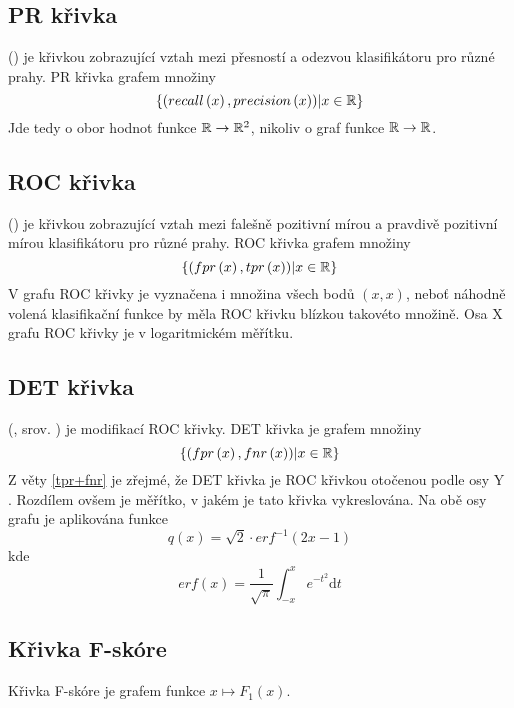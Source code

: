 \subsection{PR křivka}
 () je křivkou zobrazující vztah mezi přesností a odezvou klasifikátoru pro různé prahy. PR křivka grafem množiny
\[ \left\{ \left( recall \left( x \right), precision \left( x \right) \right) \middle| x \in \mathbb R \right\} \]
Jde tedy o obor hodnot funkce \( \mathbb R \to \mathbb R^2 \), nikoliv o graf funkce \( \mathbb R \to \mathbb R \).

\subsection{ROC křivka}
 () je křivkou zobrazující vztah mezi falešně pozitivní mírou a pravdivě pozitivní mírou klasifikátoru pro různé prahy. ROC křivka grafem množiny
\[ \left\{ \left( fpr \left( x \right), tpr \left( x \right) \right) \middle| x \in \mathbb R \right\} \]
V grafu ROC křivky je vyznačena i množina všech bodů \( \left( x, x \right) \), neboť náhodně volená klasifikační funkce by měla ROC křivku blízkou takovéto množině. Osa X grafu ROC křivky je v logaritmickém měřítku.

\subsection{DET křivka}
 (, srov. \cite{martin_det_1997}) je modifikací ROC křivky. DET křivka je grafem množiny
\[ \left\{ \left( fpr \left( x \right), fnr \left( x \right) \right) \middle| x \in \mathbb R \right\} \]
Z věty \ref{tpr+fnr} je zřejmé, že DET křivka je ROC křivkou otočenou podle osy Y . Rozdílem ovšem je měřítko, v jakém je tato křivka vykreslována. Na obě osy grafu je aplikována funkce
\[ q \left( x \right) = \sqrt{2} \cdot erf^{-1} \left( 2x - 1 \right) \]
kde
\[ erf \left( x \right) = \frac{1}{\sqrt{\pi}} \int_{-x}^{x} e^{-t^2} \mathrm{d} t \]

\subsection{Křivka F-skóre}
Křivka F-skóre je grafem funkce \( x \mapsto F_1 \left( x \right) \).

